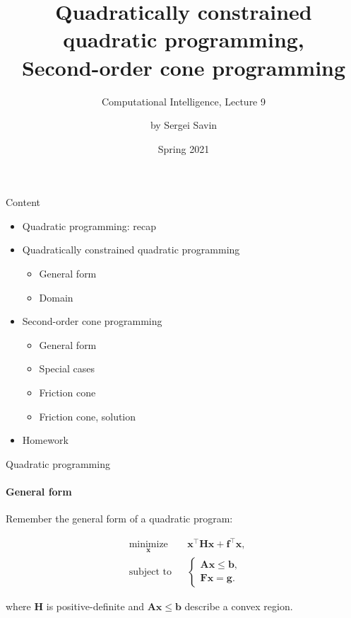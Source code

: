 \documentclass{beamer}
\title{Quadratically constrained quadratic programming, \\ Second-order cone programming}
\subtitle{Computational Intelligence, Lecture 9}
\author{by Sergei Savin}
\date{Spring 2021}
\begin{document}
\maketitle


\begin{frame}{Content}

\begin{itemize}
\item  Quadratic programming: recap
\item  Quadratically constrained quadratic programming
\begin{itemize}
    \item General form
    \item Domain
\end{itemize}
\item  Second-order cone programming
\begin{itemize}
    \item General form
    \item Special cases
    \item Friction cone
    \item Friction cone, solution
\end{itemize}
\item Homework
\end{itemize}

\end{frame}



\begin{frame}{Quadratic programming}
\framesubtitle{General form}
\begin{flushleft}

Remember the general form of a quadratic program:

%
\begin{equation}
\begin{aligned}
& \underset{\mathbf{x}}{\text{minimize}}
& & \mathbf{x}^\top \mathbf{H} \mathbf{x} + \mathbf{f}^\top\mathbf{x}, \\
& \text{subject to}
& & \begin{cases}
    \mathbf{A}\mathbf{x} \leq \mathbf{b}, \\
    \mathbf{F}\mathbf{x} = \mathbf{g}.
    \end{cases}
\end{aligned}
\end{equation}

where $\mathbf{H}$ is positive-definite and $\mathbf{A}\mathbf{x} \leq \mathbf{b}$ describe a convex region.
 
\end{flushleft}
\end{frame}
\end{document}
